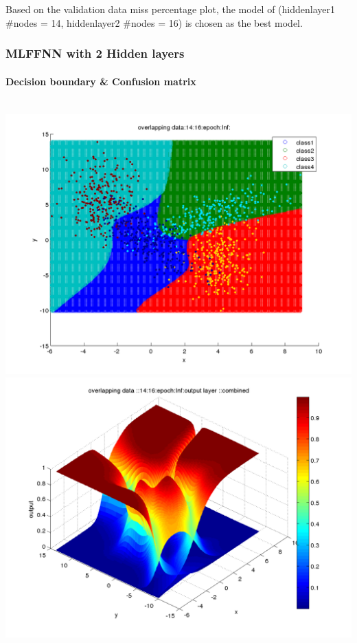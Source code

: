 \documentclass[fleqn]{article}
\newcommand{\myparagraph}[1]{\paragraph{#1}\mbox{}\\}
\begin{document}
Based on the validation data miss percentage plot, the model of (hiddenlayer1 \#nodes = 14, hiddenlayer2 \#nodes = 16) is chosen as the best model.

\subsubsection{MLFFNN with 2 Hidden layers}

\myparagraph{Decision boundary \& Confusion matrix}

\includegraphics[scale=0.3]{./pics/overlapping_data/_14_16/_14_16_epoch_Inf_decisionBoundary}
\includegraphics[scale=0.3]{./pics/overlapping_data/_14_16/_14_16_epoch_Inf_output layer :_combined}
\end{document}
